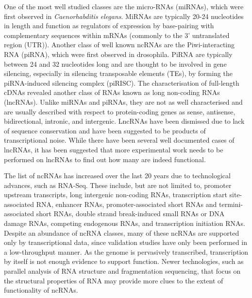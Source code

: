 One of the most well studied classes are the micro-RNAs (miRNAs), which were first observed in \textit{Caenorhabditis elegans}\cite{pmid8252621}. MiRNAs are typically 20-24 nucleotides in length and function as regulators of expression by base-pairing with complementary sequences within mRNAs (commonly to the 3' untranslated region (UTR)). Another class of well known ncRNAs are the Piwi-interacting RNA (piRNA), which were first observed in drosophila\cite{pmid11470406}. PiRNA are typically between 24 and 32 nucleotides long and are thought to be involved in gene silencing, especially in silencing transposable elements (TEs), by forming the piRNA-induced silencing complex (piRISC). The characterisation of full-length cDNAs revealed another class of RNAs known as long non-coding RNAs (lncRNAs)\cite{pmid12466851}. Unlike miRNAs and piRNAs, they are not as well characterised and are usually described with respect to protein-coding genes as sense, antisense, bidirectional, intronic, and intergenic\cite{pmid19239885}. LncRNAs have been dismissed due to lack of sequence conservation\cite{pmid15495343} and have been suggested to be products of transcriptional noise\cite{pmid15851066}. While there have been several well documented cases of lncRNAs, it has been suggested that more experimental work needs to be performed on lncRNAs to find out how many are indeed functional\cite{pmid23463798}.

The list of ncRNAs has increased over the last 20 years due to technological advances, such as RNA-Seq. These include, but are not limited to, promoter upstream transcripts\cite{pmid19056938}, long intergenic non-coding RNAs\cite{pmid21890647, pmid22196729, pmid2943744}, transcription start site-associated RNA\cite{pmid21822281}, enhancer RNAs\cite{pmid20393465}, promoter-associated short RNAs and termini-associated short RNAs\cite{pmid17510325}, double strand break-induced small RNAs\cite{pmid22445173} or DNA damage RNAs\cite{francia2012site}, competing endogenous RNAs\cite{pmid24429633}, and transcription initiation RNAs\cite{pmid19377478}. Despite an abundance of ncRNA classes, many of these ncRNAs are supported only by transcriptional data, since validation studies have only been performed in a low-throughput manner. As the genome is pervasively transcribed, transcription by itself is not enough evidence to support function. Newer technologies, such as parallel analysis of RNA structure\cite{pmid20811459} and fragmentation sequencing\cite{pmid21057495}, that focus on the structural properties of RNA may provide more clues to the extent of functionality of ncRNAs.

